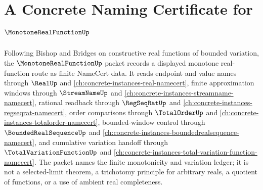 \chapter{A Concrete Naming Certificate for $\MonotoneRealFunctionUp$}
\label{ch:concrete-instances-monotone-real-function-namecert}

Following Bishop and Bridges on constructive real functions of bounded variation, the $\MonotoneRealFunctionUp$ packet records a displayed monotone real-function route as finite NameCert data. It reads endpoint and value names through $\RealUp$ and \autoref{ch:concrete-instances-real-namecert}, finite approximation windows through $\StreamNameUp$ and \autoref{ch:concrete-instances-streamname-namecert}, rational readback through $\RegSeqRatUp$ and \autoref{ch:concrete-instances-regseqrat-namecert}, order comparisons through $\TotalOrderUp$ and \autoref{ch:concrete-instances-totalorder-namecert}, bounded-window control through $\BoundedRealSequenceUp$ and \autoref{ch:concrete-instances-boundedrealsequence-namecert}, and cumulative variation handoff through $\TotalVariationFunctionUp$ and \autoref{ch:concrete-instances-total-variation-function-namecert}. The packet names the finite monotonicity and variation ledger; it is not a selected-limit theorem, a trichotomy principle for arbitrary reals, a quotient of functions, or a use of ambient real completeness.

